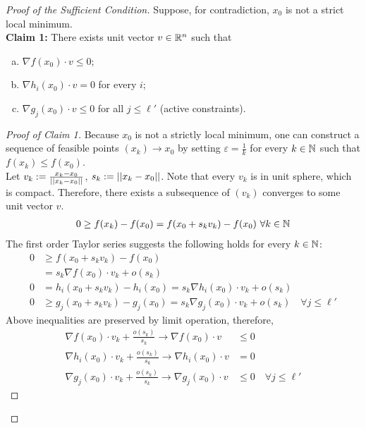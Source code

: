 \documentclass{article}
\begin{document}
	\begin{proof}[Proof of the Sufficient Condition]
		Suppose, for contradiction, $x_0$ is not a strict local minimum. \\
		\textbf{Claim 1:} There exists unit vector $v \in \mathbb{R}^n$ such that 
		\begin{enumerate}[(a)]
			\item $\nabla f(x_0) \cdot v \leq 0$;
			\item $\nabla h_i(x_0) \cdot v = 0$ for every $i$;
			\item $\nabla g_j(x_0) \cdot v \leq 0$ for all $j \leq \ell'$ (active constraints).
		\end{enumerate}
		\begin{proof}[Proof of Claim 1]
			Because $x_0$ is not a strictly local minimum, one can construct a sequence of feasible points $(x_k) \to x_0$ by setting $\varepsilon = \frac{1}{k}$ for every $k \in \mathbb{N}$ such that $f(x_k) \leq f(x_0)$. \\
			Let $v_k := \frac{x_k - x_0}{\vert \vert {x_k - x_0} \vert \vert}$, $s_k := \vert \vert {x_k - x_0} \vert \vert$. Note that every $v_k$ is in unit sphere, which is compact. Therefore, there exists a subsequence of $(v_k)$ converges to some unit vector $v$.
			\begin{align}
				0 \geq f(x_k) - f(x_0) = f(x_0 + s_k v_k) - f(x_0)\ \forall k \in \N
			\end{align}
			The first order Taylor series suggests the following holds for every $k \in \mathbb{N}$:
			\begin{align}
				0 &\geq f(x_0 + s_k v_k) - f(x_0) \\
				&= s_k \nabla f(x_0) \cdot v_k + o(s_k) \\
				0 &= h_i(x_0 + s_k v_k) - h_i(x_0) = s_k \nabla h_i(x_0) \cdot v_k + o (s_k) \\
				0 &\geq g_j(x_0 + s_k v_k) - g_j(x_0) = s_k \nabla g_j(x_0) \cdot v_k + o(s_k)\quad \forall j \leq \ell'
			\end{align}
			Above inequalities are preserved by limit operation, therefore,
			\begin{align}
				\nabla f(x_0) \cdot v_k + \frac{o(s_k)}{s_k} \to \nabla f(x_0) \cdot v &\leq 0 \\
				\nabla h_i(x_0) \cdot v_k + \frac{o(s_k)}{s_k} \to \nabla h_i(x_0) \cdot v &= 0 \\
				\nabla g_j(x_0) \cdot v_k + \frac{o(s_k)}{s_k} \to \nabla g_j(x_0) \cdot v &\leq 0\quad \forall j \leq \ell'
			\end{align}
		\end{proof}

\end{proof}
\end{document}
